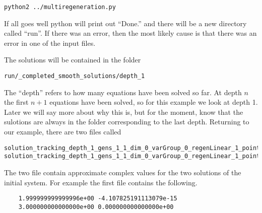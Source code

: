 \documentclass[12pt]{article}
\theoremstyle{definition}
\begin{document}
\begin{leftbar}
\vspace{-10pt} 
\begin{verbatim}
python2 ../multiregeneration.py
\end{verbatim}\vspace{-10pt} 
\end{leftbar}

If all goes well python will print out ``Done.'' and there will be 
a new directory called ``run''. If there was an error, then the most 
likely cause is that there was an error in one of the input files.

The solutions will be contained in the folder 

\begin{leftbar}
\vspace{-10pt} 
\begin{verbatim}
run/_completed_smooth_solutions/depth_1
\end{verbatim}\vspace{-10pt} 
\end{leftbar}

The ``depth'' refers to how many equations have been solved so far. At 
depth $n$ the first $n+1$ equations have been solved, so for this 
example we look at depth 1. Later we will say more about why this is, 
but for the moment, know that the sulotions are always in the folder 
corresponding to the last depth. Returning to our example, there are two 
files called 

\begin{leftbar}
\vspace{-10pt} 
\begin{verbatim}
solution_tracking_depth_1_gens_1_1_dim_0_varGroup_0_regenLinear_1_pointId_326664877375_788310760051
solution_tracking_depth_1_gens_1_1_dim_0_varGroup_0_regenLinear_1_pointId_918720474422_183602510053 
\end{verbatim}\vspace{-10pt} 
\end{leftbar}
The two file contain approximate complex values for the two solutions of 
the initial system. For example the first file contains the following.


\begin{leftbar}
\vspace{-10pt} 
\begin{verbatim}
    1.999999999999996e+00 -4.107825191113079e-15
    3.000000000000000e+00 0.000000000000000e+00
\end{verbatim}\vspace{-10pt} 
\end{leftbar}
\end{document}

